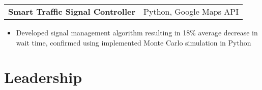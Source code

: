 \documentclass[letterpaper,11pt]{article}
\makeatletter
\newcommand{\resitem}[1]{\item[--] #1 \vspace{-8pt}}
\newcommand{\ressubheading}[4]{
	\vspace{6pt}
	\begin{tabular*}{7.5in}{l@{\extracolsep{\fill}}r}
			\textbf{#1} & #2 \\
			\textit{#3} & \textit{#4}
	\end{tabular*}
	\vspace{-12pt}
}
\newcommand{\projsubheading}[2]{
	\vspace{6pt}
	\begin{tabular*}{7.5in}{l@{\extracolsep{\fill}}r}
		\textbf{#1} & #2
	\end{tabular*}
	\vspace{-18pt}
}
\makeatother
\begin{document}
		\projsubheading{Smart Traffic Signal Controller}{Python, Google Maps API}
			\begin{itemize}[leftmargin=*]
				\resitem{Developed signal management algorithm resulting in 18\% average decrease in wait time, confirmed using implemented Monte Carlo simulation in Python}
			\end{itemize}




\section{Leadership}
\end{document}
